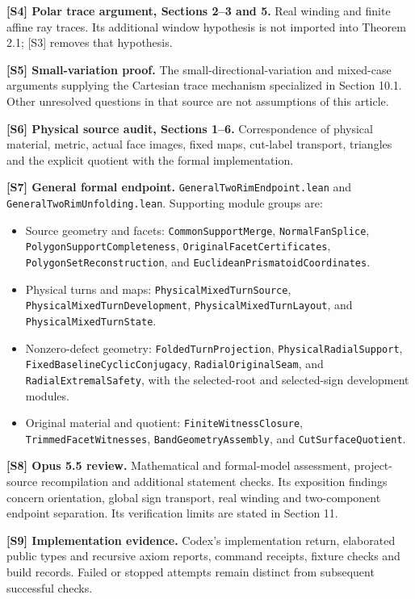 \documentclass[
  11pt,
  letterpaper,
]{article}
\providecommand{\tightlist}{%
  \setlength{\itemsep}{0pt}\setlength{\parskip}{0pt}}
\begin{document}
\textbf{{[}S4{]} Polar trace argument, Sections 2--3 and 5.} Real
winding and finite affine ray traces. Its additional window hypothesis
is not imported into Theorem 2.1; {[}S3{]} removes that hypothesis.

\textbf{{[}S5{]} Small-variation proof.} The small-directional-variation
and mixed-case arguments supplying the Cartesian trace mechanism
specialized in Section 10.1. Other unresolved questions in that source
are not assumptions of this article.

\textbf{{[}S6{]} Physical source audit, Sections 1--6.} Correspondence
of physical material, metric, actual face images, fixed maps, cut-label
transport, triangles and the explicit quotient with the formal
implementation.

\textbf{{[}S7{]} General formal endpoint.}
\texttt{GeneralTwoRimEndpoint.lean} and
\texttt{GeneralTwoRimUnfolding.lean}. Supporting module groups are:

\begin{itemize}
\tightlist
\item
  Source geometry and facets: \texttt{CommonSupportMerge},
  \texttt{NormalFanSplice}, \texttt{PolygonSupportCompleteness},
  \texttt{OriginalFacetCertificates}, \texttt{PolygonSetReconstruction},
  and \texttt{EuclideanPrismatoidCoordinates}.
\item
  Physical turns and maps: \texttt{PhysicalMixedTurnSource},
  \texttt{PhysicalMixedTurnDevelopment},
  \texttt{PhysicalMixedTurnLayout}, and \texttt{PhysicalMixedTurnState}.
\item
  Nonzero-defect geometry: \texttt{FoldedTurnProjection},
  \texttt{PhysicalRadialSupport}, \texttt{FixedBaselineCyclicConjugacy},
  \texttt{RadialOriginalSeam}, and \texttt{RadialExtremalSafety}, with
  the selected-root and selected-sign development modules.
\item
  Original material and quotient: \texttt{FiniteWitnessClosure},
  \texttt{TrimmedFacetWitnesses}, \texttt{BandGeometryAssembly}, and
  \texttt{CutSurfaceQuotient}.
\end{itemize}

\textbf{{[}S8{]} Opus 5.5 review.} Mathematical and formal-model
assessment, project-source recompilation and additional statement
checks. Its exposition findings concern orientation, global sign
transport, real winding and two-component endpoint separation. Its
verification limits are stated in Section 11.

\textbf{{[}S9{]} Implementation evidence.} Codex's implementation
return, elaborated public types and recursive axiom reports, command
receipts, fixture checks and build records. Failed or stopped attempts
remain distinct from subsequent successful checks.
\end{document}
